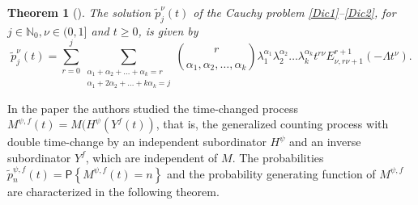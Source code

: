 \documentclass[12pt]{article}
\theoremstyle{definition}
\theoremstyle{plain}
\newtheorem{theorem}{Theorem}
\newcommand{\Prob}{\mathsf{P}}
\begin{document}
\begin{theorem}[\cite{DiC}]
	The solution $\tilde p_j^\nu(t)$ of the Cauchy problem \eqref{Dic1}--\eqref{Dic2}, for $j \in \mathbb{N}_0, \nu \in (0,1]$ and $t \ge 0$, is given by
	\begin{equation}
		\tilde p_j^\nu(t) = \sum_{r=0}^j \sum_{\substack{\alpha_1+\alpha_2+\dots+\alpha_k=r \\ \alpha_1+2\alpha_2+\dots+k\alpha_k=j}} \binom{r}{\alpha_1, \alpha_2, \dots, \alpha_k} \lambda_1^{\alpha_1} \lambda_2^{\alpha_2} \dots \lambda_k^{\alpha_k} t^{r\nu} E_{\nu,r\nu+1}^{r+1}(-\Lambda t^\nu).
	\end{equation}
\end{theorem}


  
In the paper \cite{BS2024} the authors studied the time-changed process  ${M}^{\psi,f}(t)=M(H^{\psi}(Y^f(t))$, that is, the generalized counting process with double time-change by an independent subordinator $H^{\psi}$ and an inverse subordinator $Y^f$, which are independent of $M$. The probabilities $\tilde{p}_n^{\psi,f}(t)=\Prob\left\{{M}^{\psi,f}(t)=n\right\}$ and the probability generating function of ${M}^{\psi,f}$ are characterized in the following theorem.
\end{document}
